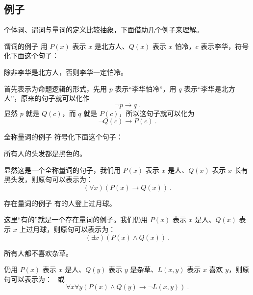 \subsection{例子}
个体词、谓词与量词的定义比较抽象，下面借助几个例子来理解。

\begin{example}{谓词的例子}
用 $P(x)$ 表示 $x$ 是北方人、$Q(x)$ 表示 $x$ 怕冷，$c$ 表示李华，符号化下面这个句子：

除非李华是北方人，否则李华一定怕冷。
\end{example}
首先表示为命题逻辑的形式，先用 $p$ 表示“李华怕冷”，用 $q$ 表示“李华是北方人”，原来的句子就可以化作
\begin{equation}
\neg p \to  q ~.
\end{equation}
显然 $p$ 就是 $Q(c)$，而 $q$ 就是 $P(c)$，所以这句子就可以化为
\begin{equation}
\neg Q(c) \to  P(c) ~.
\end{equation}

\begin{example}{全称量词的例子}
符号化下面这个句子：

所有人的头发都是黑色的。
\end{example}
显然这是一个全称量词的句子，我们用 $P(x)$ 表示 $x$ 是人、$Q(x)$ 表示 $x$ 长有黑头发，则原句可以表示为：
\begin{equation}
(\forall x)(P(x) \to Q(x)) ~.
\end{equation}

\begin{example}{存在量词的例子}
有的人登上过月球。
\end{example}
这里“有的”就是一个存在量词的例子。我们仍用 $P(x)$ 表示 $x$ 是人、$Q(x)$ 表示 $x$ 上过月球，则原句可以表示为：
\begin{equation}
(\exists x)(P(x) \land Q(x)) ~.
\end{equation}

\begin{example}{}
所有人都不喜欢杂草。
\end{example}
仍用 $P(x)$ 表示 $x$ 是人、$Q(y)$ 表示 $y$ 是杂草、$L(x, y)$ 表示 $x$ 喜欢 $y$，则原句可以表示为：
\
或
\begin{equation}
\forall x \forall y (P(x) \land Q(y) \to \neg L(x, y)) ~.
\end{equation}